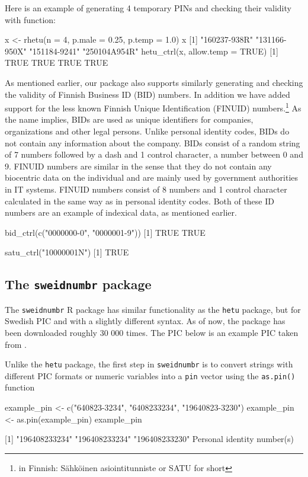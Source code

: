 Here is an example of generating 4 temporary PINs and checking their validity with  function:

\begin{example}
  x <- rhetu(n = 4, p.male = 0.25, p.temp = 1.0)
  x
  [1] "160237-938R" "131166-950X" "151184-9241" "250104A954R"
  hetu_ctrl(x, allow.temp = TRUE)
  [1] TRUE TRUE TRUE TRUE
\end{example}

As mentioned earlier, our package also supports similarly generating and checking the validity of Finnish Business ID (BID) numbers. In addition we have added support for the less known Finnish Unique Identification (FINUID) numbers.\footnote{in Finnish: Sähköinen asiointitunniste or SATU for short} As the name implies, BIDs are used as unique identifiers for companies, organizations and other legal persons. Unlike personal identity codes, BIDs do not contain any information about the company. BIDs consist of a random string of 7 numbers followed by a dash and 1 control character, a number between 0 and 9. FINUID numbers are similar in the sense that they do not contain any biocentric data on the individual and are mainly used by government authorities in IT systems. FINUID numbers consist of 8 numbers and 1 control character calculated in the same way as in personal identity codes. Both of these ID numbers are an example of indexical data, as mentioned earlier.

\begin{example}
  bid_ctrl(c("0000000-0", "0000001-9"))
  [1] TRUE TRUE

  satu_ctrl("10000001N")
  [1] TRUE
\end{example}

\subsection{The \texttt{sweidnumbr} package}

 The \texttt{sweidnumbr} R package has similar functionality as the \texttt{hetu} package, but for Swedish PIC and with a slightly different syntax. As of now, the package has been downloaded roughly 30 000 times. The PIC below is an example PIC taken from \citet{sv2007}.

 Unlike the \texttt{hetu} package, the first step in \texttt{sweidnumbr} is to convert strings with different PIC formats or numeric variables into a \texttt{pin} vector using the \texttt{as.pin()} function

 \begin{example}
   example_pin <- c("640823-3234", "6408233234", "19640823-3230")
   example_pin <- as.pin(example_pin)
   example_pin

   [1] "196408233234" "196408233234" "196408233230"
   Personal identity number(s)
 \end{example}

